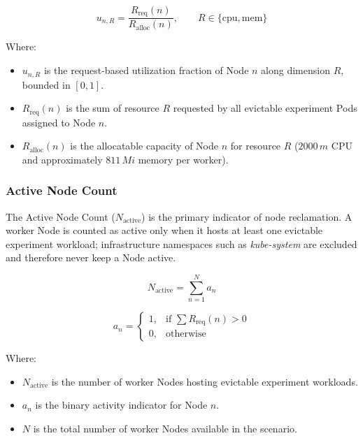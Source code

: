 \[
u_{n,R}
=
\frac{R_{\text{req}}(n)}
{R_{\text{alloc}}(n)},
\qquad
R \in \{\text{cpu}, \text{mem}\}
\]

Where:

\begin{itemize}
    \item \(u_{n,R}\) is the request-based utilization fraction of Node \(n\) along dimension \(R\), bounded in \([0,1]\).

    \item \(R_{\text{req}}(n)\) is the sum of resource \(R\) requested by all evictable experiment Pods assigned to Node \(n\).

    \item \(R_{\text{alloc}}(n)\) is the allocatable capacity of Node \(n\) for resource \(R\) (\(2000\,m\) CPU and approximately \(811\,Mi\) memory per worker).
\end{itemize}

\subsubsection{Active Node Count}
\label{subsubsec:defrag_metric_active}
The Active Node Count (\(N_{\text{active}}\)) is the primary indicator of node reclamation. A worker Node is counted as active only when it hosts at least one evictable experiment workload; infrastructure namespaces such as \textit{kube-system} are excluded and therefore never keep a Node active.

\[
N_{\text{active}}
=
\sum_{n=1}^{N} a_n
\]

\[
a_n =
\begin{cases}
1, & \text{if } \sum R_{\text{req}}(n) > 0 \\
0, & \text{otherwise}
\end{cases}
\]

Where:

\begin{itemize}
    \item \(N_{\text{active}}\) is the number of worker Nodes hosting evictable experiment workloads.

    \item \(a_n\) is the binary activity indicator for Node \(n\).

    \item \(N\) is the total number of worker Nodes available in the scenario.
\end{itemize}


